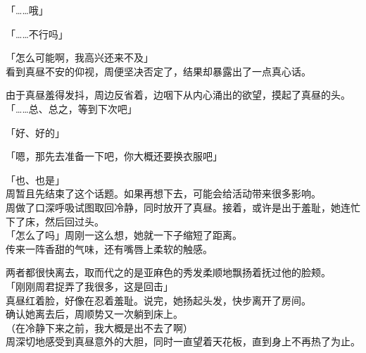 「……哦」

「……不行吗」

「怎么可能啊，我高兴还来不及」\\

看到真昼不安的仰视，周便坚决否定了，结果却暴露出了一点真心话。%

由于真昼羞得发抖，周边反省着，边咽下从内心涌出的欲望，摸起了真昼的头。\\

「……总、总之，等到下次吧」

「好、好的」

「嗯，那先去准备一下吧，你大概还要换衣服吧」

「也、也是」\\

周暂且先结束了这个话题。如果再想下去，可能会给活动带来很多影响。\\

周做了口深呼吸试图取回冷静，同时放开了真昼。接着，或许是出于羞耻，她连忙下了床，然后回过头。\\

「怎么了吗」周刚一这么想，她就一下子缩短了距离。\\

传来一阵香甜的气味，还有嘴唇上柔软的触感。

两者都很快离去，取而代之的是亚麻色的秀发柔顺地飘扬着抚过他的脸颊。\\

「刚刚周君捉弄了我很多，这是回击」\\

真昼红着脸，好像在忍着羞耻。说完，她扬起头发，快步离开了房间。\\

确认她离去后，周顺势又一次躺到床上。\\

（在冷静下来之前，我大概是出不去了啊）\\

周深切地感受到真昼意外的大胆，同时一直望着天花板，直到身上不再热了为止。
